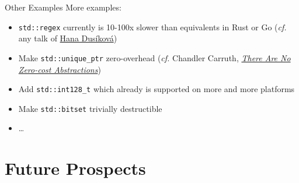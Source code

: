 \begin{frame}{Other Examples}
    More examples:
    \begin{itemize}
        \item \texttt{std::regex} currently is 10-100x slower than equivalents in Rust or Go (\textit{cf.} any talk of \href{https://youtu.be/8dKWdJzPwHw}{Hana Dusíková})
        \item Make \texttt{std::unique\_ptr} zero-overhead (\textit{cf.} Chandler Carruth, \href{https://youtu.be/rHIkrotSwcc}{\textit{There Are No Zero-cost Abstractions}})
        \item Add \texttt{std::int128\_t} which already is supported on more and more platforms
        \item Make \texttt{std::bitset} trivially destructible
        \item \ldots
    \end{itemize}

    \centering
\end{frame}

\section{Future Prospects}

\begin{frame}
    \centering
    \scalebox{3}{Future Prospects}
\end{frame}

